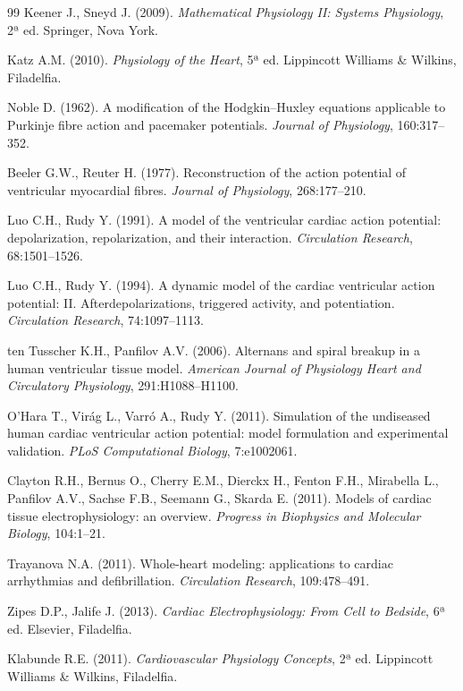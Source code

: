 \begin{thebibliography}{99}
 Keener J., Sneyd J. (2009). \textit{Mathematical
Physiology II: Systems Physiology}, 2ª ed. Springer, Nova York.

 Katz A.M. (2010). \textit{Physiology of the Heart}, 5ª
ed. Lippincott Williams \& Wilkins, Filadelfia.

 Noble D. (1962). A modification of the Hodgkin--Huxley
equations applicable to Purkinje fibre action and pacemaker potentials.
\textit{Journal of Physiology}, 160:317--352.

 Beeler G.W., Reuter H. (1977). Reconstruction of the
action potential of ventricular myocardial fibres. \textit{Journal of
Physiology}, 268:177--210.

 Luo C.H., Rudy Y. (1991). A model of the ventricular
cardiac action potential: depolarization, repolarization, and their
interaction. \textit{Circulation Research}, 68:1501--1526.

 Luo C.H., Rudy Y. (1994). A dynamic model of the cardiac
ventricular action potential: II. Afterdepolarizations, triggered
activity, and potentiation. \textit{Circulation Research}, 74:1097--1113.

 ten Tusscher K.H., Panfilov A.V. (2006).
Alternans and spiral breakup in a human ventricular tissue model.
\textit{American Journal of Physiology Heart and Circulatory
Physiology}, 291:H1088--H1100.

 O'Hara T., Virág L., Varró A., Rudy Y. (2011). Simulation
of the undiseased human cardiac ventricular action potential: model
formulation and experimental validation. \textit{PLoS Computational
Biology}, 7:e1002061.

 Clayton R.H., Bernus O., Cherry E.M., Dierckx H.,
Fenton F.H., Mirabella L., Panfilov A.V., Sachse F.B., Seemann G.,
Skarda E. (2011). Models of cardiac tissue electrophysiology: an
overview. \textit{Progress in Biophysics and Molecular Biology},
104:1--21.

 Trayanova N.A. (2011). Whole-heart modeling:
applications to cardiac arrhythmias and defibrillation. \textit{Circulation
Research}, 109:478--491.

 Zipes D.P., Jalife J. (2013). \textit{Cardiac
Electrophysiology: From Cell to Bedside}, 6ª ed. Elsevier, Filadelfia.

 Klabunde R.E. (2011). \textit{Cardiovascular
Physiology Concepts}, 2ª ed. Lippincott Williams \& Wilkins,
Filadelfia.


\end{thebibliography}

